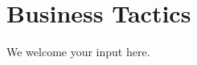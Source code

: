 \section{Business Tactics}%
\label{sec:ekg-mm-a-1-3}
\label{sec:ekg-mm-business-tactics}



\ekgmmContextSection

We welcome your input here.
